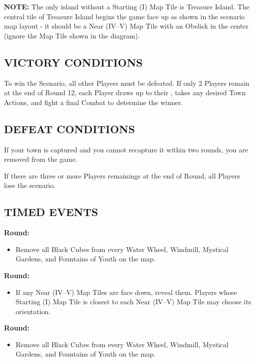 \begin{multicols*}{2}
\textbf{\MakeUppercase{Note:}} The only island without a Starting (I) Map Tile is Treasure Island. The central tile of Treasure Island begins the game face up as shown in the scenario map layout - it should be a Near (IV--V) Map Tile with an Obelisk in the center (ignore the Map Tile shown in the diagram).

\subsection*{\MakeUppercase{Victory Conditions}}
To win the Scenario, all other Players must be defeated. If only 2 Players remain at the end of Round 12, each Player draws up to their , takes any desired Town Actions, and fight a final Combat to determine the winner.

\subsection*{\MakeUppercase{Defeat Conditions}}
If your town is captured and you cannot recapture it within two rounds, you are removed from the game.

If there are three or more Players remainings at the end of  Round, all Players lose the scenario.

\subsection*{\MakeUppercase{Timed Events}}

\textbf{ Round:}
\begin{itemize}
  \item Remove all Black Cubes from every Water Wheel, Windmill, Mystical Gardens, and Fountains of Youth on the map.
\end{itemize}

\textbf{ Round:}
\begin{itemize}
  \item If any Near (IV--V) Map Tiles are face down, reveal them. Players whose Starting (I) Map Tile is closest to each Near (IV--V) Map Tile may choose its orientation.
\end{itemize}

\textbf{ Round:}
\begin{itemize}
  \item Remove all Black Cubes from every Water Wheel, Windmill, Mystical Gardens, and Fountains of Youth on the map.
\end{itemize}


\end{multicols*}
